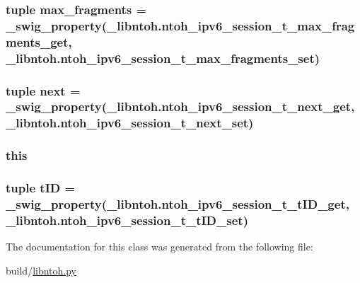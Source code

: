 \hypertarget{classlibntoh_1_1ntoh__ipv6__session__t_aae26317f4443b9f0f36780fb035d1ec9}{
\subsubsection[{max\-\_\-fragments}]{\setlength{\rightskip}{0pt plus 5cm}tuple max\-\_\-fragments = {\bf \-\_\-swig\-\_\-property}(\-\_\-libntoh.\-ntoh\-\_\-ipv6\-\_\-session\-\_\-t\-\_\-max\-\_\-fragments\-\_\-get, \-\_\-libntoh.\-ntoh\-\_\-ipv6\-\_\-session\-\_\-t\-\_\-max\-\_\-fragments\-\_\-set)\hspace{0.3cm}{\ttfamily [static]}}}\label{classlibntoh_1_1ntoh__ipv6__session__t_aae26317f4443b9f0f36780fb035d1ec9}
\hypertarget{classlibntoh_1_1ntoh__ipv6__session__t_a84e6dac37062f5a539ece8248c8567cc}{
\subsubsection[{next}]{\setlength{\rightskip}{0pt plus 5cm}tuple next = {\bf \-\_\-swig\-\_\-property}(\-\_\-libntoh.\-ntoh\-\_\-ipv6\-\_\-session\-\_\-t\-\_\-next\-\_\-get, \-\_\-libntoh.\-ntoh\-\_\-ipv6\-\_\-session\-\_\-t\-\_\-next\-\_\-set)\hspace{0.3cm}{\ttfamily [static]}}}\label{classlibntoh_1_1ntoh__ipv6__session__t_a84e6dac37062f5a539ece8248c8567cc}
\hypertarget{classlibntoh_1_1ntoh__ipv6__session__t_a05c09a5e9d53fa7adf0a7936038c2fa3}{
\subsubsection[{this}]{\setlength{\rightskip}{0pt plus 5cm}this}}\label{classlibntoh_1_1ntoh__ipv6__session__t_a05c09a5e9d53fa7adf0a7936038c2fa3}
\hypertarget{classlibntoh_1_1ntoh__ipv6__session__t_aa8af5c32a2a96a7fe7e14b7ebd2057ba}{
\subsubsection[{t\-I\-D}]{\setlength{\rightskip}{0pt plus 5cm}tuple t\-I\-D = {\bf \-\_\-swig\-\_\-property}(\-\_\-libntoh.\-ntoh\-\_\-ipv6\-\_\-session\-\_\-t\-\_\-t\-I\-D\-\_\-get, \-\_\-libntoh.\-ntoh\-\_\-ipv6\-\_\-session\-\_\-t\-\_\-t\-I\-D\-\_\-set)\hspace{0.3cm}{\ttfamily [static]}}}\label{classlibntoh_1_1ntoh__ipv6__session__t_aa8af5c32a2a96a7fe7e14b7ebd2057ba}


The documentation for this class was generated from the following file\-:\begin{DoxyCompactItemize}
\item 
build/\hyperlink{libntoh_8py}{libntoh.\-py}\end{DoxyCompactItemize}

